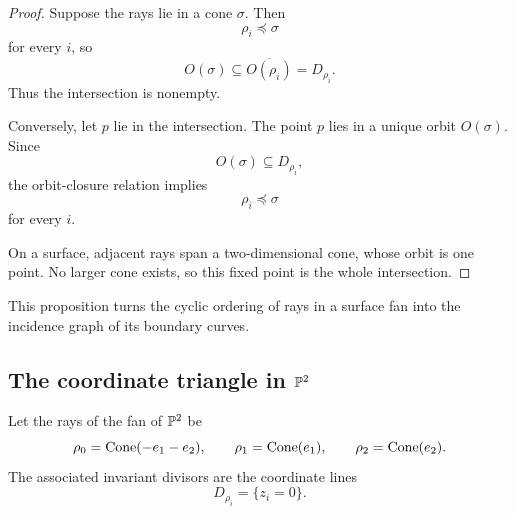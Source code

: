 \begin{proof}
Suppose the rays lie in a cone \(\sigma\). Then
\[
\rho_i\preceq\sigma
\]
for every \(i\), so
\[
O(\sigma)\subseteq
\overline{O(\rho_i)}
=
D_{\rho_i}.
\]
Thus the intersection is nonempty.

Conversely, let \(p\) lie in the intersection. The point \(p\) lies
in a unique orbit \(O(\sigma)\). Since
\[
O(\sigma)\subseteq D_{\rho_i},
\]
the orbit-closure relation implies
\[
\rho_i\preceq\sigma
\]
for every \(i\).

On a surface, adjacent rays span a two-dimensional cone, whose orbit
is one point. No larger cone exists, so this fixed point is the whole
intersection.
\end{proof}

This proposition turns the cyclic ordering of rays in a surface fan
into the incidence graph of its boundary curves.

\subsection{The coordinate triangle in \texorpdfstring{\(\mathbb{P}^2\)}{P2}}

Let the rays of the fan of \(\mathbb{P}^2\) be
\[
\rho_0=\operatorname{Cone}(-e_1-e_2),
\qquad
\rho_1=\operatorname{Cone}(e_1),
\qquad
\rho_2=\operatorname{Cone}(e_2).
\]
The associated invariant divisors are the coordinate lines
\[
D_{\rho_i}
=
\{z_i=0\}.
\]

